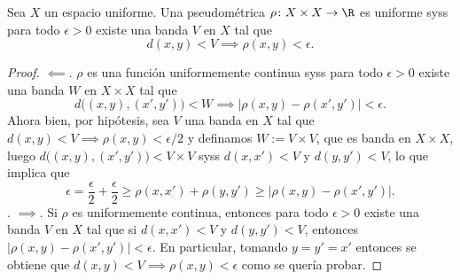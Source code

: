 \documentclass[topologia-analisis.tex]{subfiles}
\begin{document}
\begin{prop}\label{thm:uniform_pseudometric}
	Sea $X$ un espacio uniforme.
	Una pseudométrica $\rho\colon X \times X \to \R$ es uniforme syss para todo $\epsilon > 0$ existe una banda $V$ en $X$ tal que
	$$ d(x, y) < V \implies \rho(x, y) < \epsilon. $$
\end{prop}
\begin{proof}
	$\impliedby$. $\rho$ es una función uniformemente continua syss para todo $\epsilon > 0$ existe una banda $W$ en $X \times X$ tal que
	$$ d\big( (x, y), (x', y') \big) < W \implies |\rho(x, y) - \rho(x', y')| < \epsilon. $$ 
	Ahora bien, por hipótesis, sea $V$ una banda en $X$ tal que $d(x, y) < V \implies \rho(x, y) < \epsilon/2$ y definamos $W := V \times V$,
	que es banda en $X \times X$, luego $d\big( (x, y), (x', y') \big) < V\times V$ syss $d(x, x') < V$ y $d(y, y') < V$, lo que implica que
	$$ \epsilon = \frac{\epsilon}{2} + \frac{\epsilon}{2} \ge \rho(x, x') + \rho(y, y') \ge |\rho(x, y) - \rho(x', y')|. $$.
	$\implies$. Si $\rho$ es uniformemente continua, entonces para todo $\epsilon > 0$ existe una banda $V$ en $X$ tal que si $d(x, x') < V$ y
	$d(y, y') < V$, entonces $|\rho(x, y) - \rho(x', y')| < \epsilon$. En particular, tomando $y = y' = x'$ entonces se obtiene que
	$d(x, y) < V \implies \rho(x, y) < \epsilon$ como se quería probar.
\end{proof}
\end{document}
